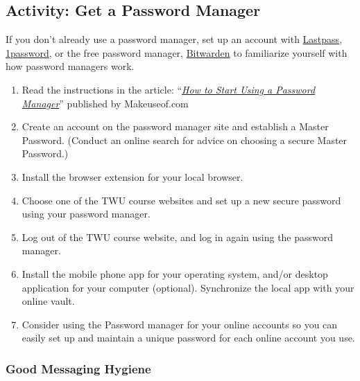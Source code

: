 \documentclass[
]{book}
\providecommand{\tightlist}{%
  \setlength{\itemsep}{0pt}\setlength{\parskip}{0pt}}
\theoremstyle{definition}
\theoremstyle{definition}
\theoremstyle{definition}
\theoremstyle{definition}
\theoremstyle{remark}
\begin{document}
\hypertarget{activity-get-a-password-manager}{%
\subsection*{Activity: Get a Password Manager}\label{activity-get-a-password-manager}}

\begin{reflect}
If you don't already use a password manager, set up an account with \href{https://www.lastpass.com/}{Lastpass}, \href{https://1password.com/}{1password}, or the free password manager, \href{https://bitwarden.com/}{Bitwarden} to familiarize yourself with how password managers work.

\begin{enumerate}
\def\labelenumi{\arabic{enumi}.}
\tightlist
\item
  Read the instructions in the article: ``\href{https://www.makeuseof.com/how-to-start-using-password-manager/}{\emph{How to Start Using a Password Manager}}'' published by Makeuseof.com\\
\item
  Create an account on the password manager site and establish a Master Password. (Conduct an online search for advice on choosing a secure Master Password.)\\
\item
  Install the browser extension for your local browser.\\
\item
  Choose one of the TWU course websites and set up a new secure password using your password manager.\\
\item
  Log out of the TWU course website, and log in again using the password manager.\\
\item
  Install the mobile phone app for your operating system, and/or desktop application for your computer (optional). Synchronize the local app with your online vault.\\
\item
  Consider using the Password manager for your online accounts so you can easily set up and maintain a unique password for each online account you use.
\end{enumerate}
\end{reflect}

\hypertarget{good-messaging-hygiene}{%
\subsubsection*{Good Messaging Hygiene}\label{good-messaging-hygiene}}
\end{document}

